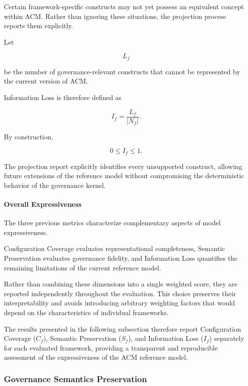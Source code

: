 \documentclass[10pt]{article}
\begin{document}
Certain framework-specific constructs may not yet possess an equivalent concept
within ACM. Rather than ignoring these situations, the projection process
reports them explicitly.

Let

\[
L_f
\]

be the number of governance-relevant constructs that cannot be represented by
the current version of ACM.

Information Loss is therefore defined as

\begin{equation}
I_f =
\frac{L_f}
{|N_f|}.
\label{eq:information_loss}
\end{equation}

By construction,

\[
0 \le I_f \le 1.
\]

The projection report explicitly identifies every unsupported construct,
allowing future extensions of the reference model without compromising the
deterministic behavior of the governance kernel.

\paragraph{Overall Expressiveness}

The three previous metrics characterize complementary aspects of model
expressiveness.

Configuration Coverage evaluates representational completeness, Semantic
Preservation evaluates governance fidelity, and Information Loss quantifies the
remaining limitations of the current reference model.

Rather than combining these dimensions into a single weighted score, they are
reported independently throughout the evaluation. This choice preserves their
interpretability and avoids introducing arbitrary weighting factors that would
depend on the characteristics of individual frameworks.

The results presented in the following subsection therefore report
Configuration Coverage (\(C_f\)), Semantic Preservation (\(S_f\)), and
Information Loss (\(I_f\)) separately for each evaluated framework, providing a
transparent and reproducible assessment of the expressiveness of the ACM
reference model.

\subsubsection{Governance Semantics Preservation}
\end{document}
